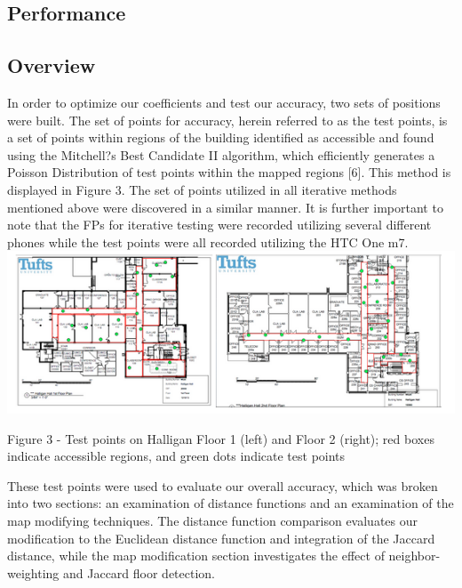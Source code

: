 \documentclass[twoside]{article}
\begin{document}
\begin{multicols}{2}

\section{Performance}

\subsection{Overview}

\indent In order to optimize our coefficients and test our accuracy, two sets of positions were built. The set of points for accuracy, herein referred to as the test points, is a set of points within regions of the building identified as accessible and found using the Mitchell?s Best Candidate II algorithm, which efficiently generates a Poisson Distribution of test points within the mapped regions [6]. This method is displayed in Figure 3. The set of points utilized in all iterative methods mentioned above were discovered in a similar manner. It is further important to note that the FPs for iterative testing were recorded utilizing several different phones while the test points were all recorded utilizing the HTC One m7.\\

\includegraphics[width=\linewidth]{testpoints}
\begin{center}
Figure 3 - Test points on Halligan Floor 1 (left) and Floor 2 (right); red boxes indicate accessible regions, and green dots indicate test points
\end{center}

\indent These test points were used to evaluate our overall accuracy, which was broken into two sections: an examination of distance functions  and an examination of the map modifying techniques. The distance function comparison evaluates our modification to the Euclidean distance function and integration of the Jaccard distance, while the map modification section investigates the effect of neighbor-weighting and Jaccard floor detection.
	

\end{multicols}
\end{document}
